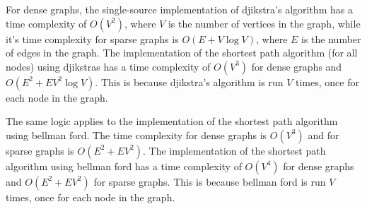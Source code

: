 \documentclass[12pt]{article}
\begin{document}
\smallskip
For dense graphs, the single-source implementation of djikstra's algorithm has a time complexity of $O(V^2)$,
where $V$ is the number of vertices in the graph, while it's time complexity for sparse graphs is $O(E + V \log V)$, where $E$ is the number of edges in the graph.
The implementation of the shortest path algorithm (for all nodes) using djikstras has a time complexity of 
$O(V^3)$ for dense graphs and $O(E^2 + EV^2 \log V)$. This is because djikstra's algorithm is run $V$ times, once for each node in the graph.

\smallskip
The same logic applies to the implementation of the shortest path algorithm using bellman ford. The time complexity for dense graphs is $O(V^3)$ and for sparse graphs is $O(E^2 + EV^2)$.
The implementation of the shortest path algorithm using bellman ford has a time complexity of $O(V^4)$ for dense graphs and $O(E^2 + EV^2)$ for sparse graphs. This is because bellman ford is run $V$ times, once for each node in the graph.
\end{document}
